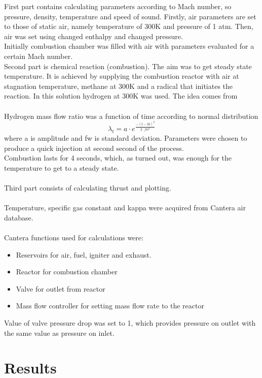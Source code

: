 \documentclass[a4paper, 12pt]{article}
\begin{document}
First part contains calculating parameters according to Mach number, so pressure, density, temperature and speed of sound. Firstly, air parameters are set to those of static air, namely temperature of 300K and pressure of 1 atm. Then, air was set using changed enthalpy and changed pressure.\\

Initially combustion chamber was filled with air with parameters evaluated for a certain Mach number.\\

Second part is chemical reaction (combustion). The aim was to get steady state temperature. It is achieved by supplying the combustion reactor with air at stagnation temperature, methane at 300K and a radical that initiates the reaction. In this solution hydrogen at 300K was used. The idea comes from \cite{three} \\\\
Hydrogen mass flow ratio was a function of time according to normal distribution
\[\lambda_t = a \cdot  e^{\frac{-(t-t0)^2}{2\cdot fw^2}} \]
where a is amplitude and fw is standard deviation. Parameters were chosen to produce a quick injection at second second of the process.\\

Combustion lasts for 4 seconds, which, as turned out, was enough for the temperature to get to a steady state.\\\\
Third part consists of calculating thrust and plotting.\\\\
Temperature, specific gas constant and kappa were acquired from Cantera air database.\\\\
Cantera functions used for calculations were:

\begin{itemize}
\item Reservoirs for air, fuel, igniter and exhaust.
\item Reactor for combustion chamber
\item Valve for outlet from reactor
\item Mass flow controller for setting mass flow rate to the reactor
\end{itemize}

Value of valve pressure drop was set to 1, which provides pressure on outlet with the same value as pressure on inlet.

\section{Results}
\end{document}
